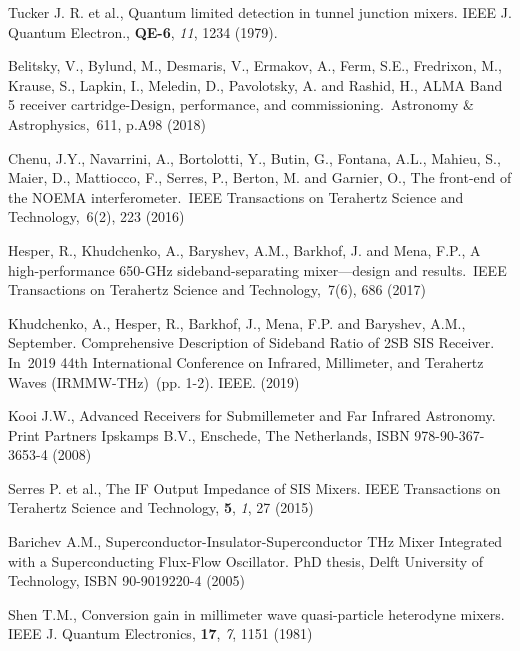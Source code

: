 \documentclass[a4paper]{article}
\begin{document}
\begin{thebibliography}{7}

 Tucker J. R. et al., Quantum limited detection in tunnel junction mixers. IEEE J. Quantum Electron., \textbf{QE-6}, \textit{11}, 1234 (1979).

 Belitsky, V., Bylund, M., Desmaris, V., Ermakov, A., Ferm, S.E., Fredrixon, M., Krause, S., Lapkin, I., Meledin, D., Pavolotsky, A. and Rashid, H., ALMA Band 5 receiver cartridge-Design, performance, and commissioning. Astronomy \& Astrophysics, 611, p.A98 (2018)

 Chenu, J.Y., Navarrini, A., Bortolotti, Y., Butin, G., Fontana, A.L., Mahieu, S., Maier, D., Mattiocco, F., Serres, P., Berton, M. and Garnier, O., The front-end of the NOEMA interferometer. IEEE Transactions on Terahertz Science and Technology, 6(2), 223 (2016)

 Hesper, R., Khudchenko, A., Baryshev, A.M., Barkhof, J. and Mena, F.P., A high-performance 650-GHz sideband-separating mixer—design and results. IEEE Transactions on Terahertz Science and Technology, 7(6), 686 (2017)

 Khudchenko, A., Hesper, R., Barkhof, J., Mena, F.P. and Baryshev, A.M., September. Comprehensive Description of Sideband Ratio of 2SB SIS Receiver. In 2019 44th International Conference on Infrared, Millimeter, and Terahertz Waves (IRMMW-THz) (pp. 1-2). IEEE.  (2019)

 Kooi J.W., Advanced Receivers for Submillemeter and Far Infrared Astronomy. Print Partners Ipskamps B.V., Enschede, The Netherlands, ISBN 978-90-367-3653-4 (2008)

 Serres P. et al., The IF Output Impedance of SIS Mixers. IEEE Transactions on Terahertz Science and Technology, \textbf{5}, \textit{1}, 27 (2015)

 Barichev A.M., Superconductor-Insulator-Superconductor THz Mixer Integrated with a Superconducting Flux-Flow Oscillator. PhD thesis, Delft University of Technology, ISBN 90-9019220-4 (2005)

 Shen T.M., Conversion gain in millimeter wave quasi-particle heterodyne mixers. IEEE J. Quantum Electronics, \textbf{17},  \textit{7}, 1151 (1981)

\end{thebibliography}
\end{document}
